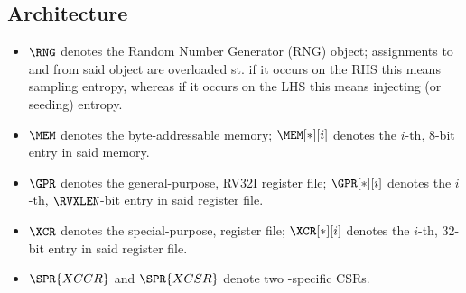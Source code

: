 
\subsection{Architecture}

\begin{itemize}

\item $\RNG$
      denotes the Random Number Generator (RNG) object;
      assignments to and from said object are overloaded st. if
      it occurs on the RHS this means sampling               entropy,
      whereas if
      it occurs on the LHS this means injecting (or seeding) entropy.
\item $\MEM$
      denotes the byte-addressable memory;
      $\MEM[*][i]$ 
      denotes the $i$-th,
            $8$-bit 
      entry in said memory.
\item $\GPR$ 
      denotes the 
      general-purpose, RV32I register file;
      $\GPR[*][i]$ 
      denotes the $i$-th,
      $\RVXLEN$-bit
      entry in said register file.
\item $\XCR$ 
      denotes the 
      special-purpose, \XCID register file;
      $\XCR[*][i]$ 
      denotes the $i$-th,
           $32$-bit 
      entry in said register file.
\item $\SPR{XCCR}$
      and
      $\SPR{XCSR}$
      denote two \XCID-specific CSRs.

\end{itemize}

